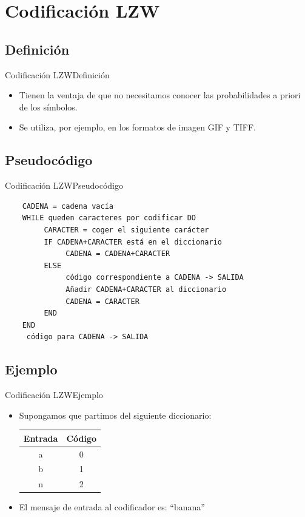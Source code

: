 \documentclass[10pt,compress]{beamer} %
\begin{document}
\section{Codificación LZW}

\subsection{Definición}
\begin{frame}{Codificación LZW}{Definición}
	\begin{itemize}
    \item Tienen la ventaja de que no necesitamos conocer las probabilidades a priori de los símbolos.
    \item Se utiliza, por ejemplo, en los formatos de imagen GIF y TIFF.
	\end{itemize}
\end{frame}

\subsection{Pseudocódigo}
\begin{frame}[fragile]{Codificación LZW}{Pseudocódigo}
  \footnotesize
  \begin{verbatim}
    CADENA = cadena vacía
    WHILE queden caracteres por codificar DO
         CARACTER = coger el siguiente carácter
         IF CADENA+CARACTER está en el diccionario
              CADENA = CADENA+CARACTER
         ELSE
              código correspondiente a CADENA -> SALIDA
              Añadir CADENA+CARACTER al diccionario
              CADENA = CARACTER
         END
    END
     código para CADENA -> SALIDA
  \end{verbatim}
\end{frame}

\subsection{Ejemplo}
\begin{frame}{Codificación LZW}{Ejemplo}
	\begin{itemize}
    \item Supongamos que partimos del siguiente diccionario:

    \begin{tabular}{cc}
      Entrada & Código \\
      \hline
      a & 0 \\
      b & 1 \\
      n & 2 \\
    \end{tabular}
    \item El mensaje de entrada al codificador es: ``banana''
	\end{itemize}
\end{frame}
\end{document}
